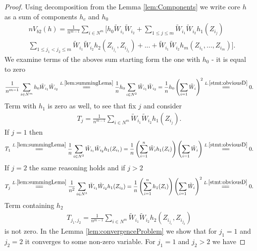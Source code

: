 \begin{proof}
Using decomposition from the Lemma \ref{lem:Components} we write core  $h$ as a sum of components $h_c$ and $h_0$  
\begin{align}
\label{eq:bootstrapedOne}
 &n V_{b2}(h) = \frac{1} {n^{m-1}}  \sum_{i \in N^m}  \Big[h_0  \tilde W_{i_1} \tilde W_{i_2} + \sum_{1 \leq j \leq m } \tilde W_{i_1} \tilde W_{i_2} h_1(Z_{i_j})    \\ 
 &\sum_{1 \leq j_1 < j_2 \leq m } \tilde W_{i_1} \tilde W_{i_2} h_2(Z_{i_{j_1}},Z_{i_{j_2}}) + ... +  \tilde W_{i_1} \tilde W_{i_2}   h_m(Z_{i_1},...,Z_{i_m}) \Big].
\end{align}
We examine terms of the aboves sum starting form the one with $h_0$ - it is equal to zero
\begin{align}
\frac{1} {n^{m-1}}  \sum_{i \in N^m}  h_0  \tilde W_{i_1} \tilde W_{i_2}   \overset{L.\ref{lem:summingLema}}{=\joinrel=} \frac 1 n h_0 \sum_{i \in N^2} \tilde W_{i_1} \tilde W_{i_2} = \frac 1 n h_0 \left( \sum_{i=1} \tilde W_i \right)^2  \overset{L.\ref{stmt:obviousD}}{=\joinrel=} 0.
\end{align}  
Term with $h_1$ is zero as well, to see that fix $j$ and consider 
\begin{align}
T_{j} = \frac{1} {n^{m-1}}  \sum_{i \in N^m}  \tilde W_{i_1} \tilde W_{i_2} h_1(Z_{i_j}).  
\end{align}  
If $j=1$ then
\begin{align}
T_{1} \overset{L.\ref{lem:summingLema}}{=\joinrel=} \frac{1} {n}  \sum_{i \in N^2}  \tilde W_{i_1} \tilde W_{i_2} h_1(Z_{i_1}) =  \frac{1} {n}  \left( \sum_{i=1}^n  \tilde W_i h_1(Z_i) \right) \left( \sum_{i=1} \tilde W_i \right) \overset{L.\ref{stmt:obviousD}}{=\joinrel=} 0.
\end{align}
If $j=2$ the same reasoning holds and if $j>2$
\begin{align}
T_{j} \overset{L.\ref{lem:summingLema}}{=\joinrel=} \frac{1} {n^2}  \sum_{i \in N^3}  \tilde W_{i_1} \tilde W_{i_2} h_1(Z_{i_3}) =  \frac{1} {n}  \left( \sum_{i=1}^n h_1(Z_i) \right) \left( \sum_{i=1} \tilde W_i \right)^2 \overset{L.\ref{stmt:obviousD}}{=\joinrel=} 0.
\end{align}
Term containing $h_2$ 
\begin{align}
T_{j_1,j_2} = \frac{1} {n^{m-1}}  \sum_{i \in N^m}  \tilde W_{i_1} \tilde W_{i_2} h_2(Z_{i_{j_1}},Z_{i_{j_2}})
\end{align}
is not zero. In the Lemma \ref{lem:convergenceProblem}  we show that for $j_1=1$ and $j_2=2$ it  converges to some non-zero variable. For $j_1 = 1$ and $j_2 > 2$ we have

\end{proof}
